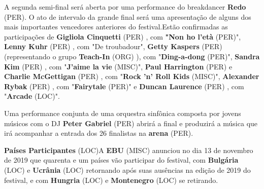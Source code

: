 \documentclass[12pt,a4paper]{article}
\begin{document}
A segunda semi-final será aberta por uma performance do breakdancer \textbf{Redo} (PER). O ato de intervalo da grande final será uma apresentação de alguns dos mais importantes vencedores anteriores do festival.Estão confirmadas as participações de \textbf{Gigliola Cinquetti} (PER) , com \textbf{"Non ho l'età} (PER)", \textbf{Lenny Kuhr} (PER) , com "De troubadour", \textbf{Getty Kaspers} (PER) (representando o grupo \textbf{Teach-In} (ORG) ), com "\textbf{Ding-a-dong} (PER)", \textbf{Sandra Kim} (PER) , com "\textbf{J'aime la vie} (MISC)", \textbf{Paul Harrington} (PER) e \textbf{Charlie McGettigan} (PER) , com "\textbf{Rock 'n' Roll Kids} (MISC)", \textbf{Alexander Rybak} (PER) , com "\textbf{Fairytale} (PER)" e \textbf{Duncan Laurence} (PER) , com "\textbf{Arcade} (LOC)".

Uma performance conjunta de uma orquestra sinfônica composta por jovens músicos com o DJ \textbf{Peter Gabriel} (PER) abrirá a final e produzirá a música que irá acompanhar a entrada dos 26 finalistas na \textbf{arena} (PER).



\textbf{Países Participantes} (LOC)A \textbf{EBU} (MISC) anunciou no dia 13 de novembro de 2019 que quarenta e um países vão participar do festival, com \textbf{Bulgária} (LOC) e \textbf{Ucrânia} (LOC) retornando após suas ausências na edição de 2019 do festival, e com \textbf{Hungria} (LOC) e \textbf{Montenegro} (LOC) se retirando.
\end{document}

